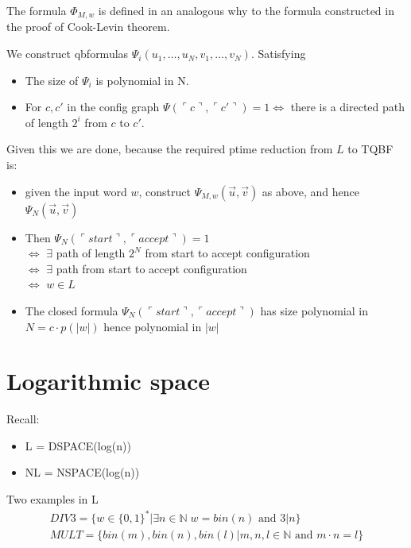 \documentclass[a4paper,12pt]{article}
\theoremstyle{definition}
\theoremstyle{remark}
\newcommand{\N}{\mathbb{N}}
\begin{document}
The formula $\Phi_{M, w}$ is defined in an analogous why to the formula constructed in the proof of Cook-Levin theorem.

We construct qbformulas $\Psi_i (u_1, \dots, u_N, v_1, \dots, v_N)$. Satisfying
\begin{itemize}
    \item The size of $\Psi_i$ is polynomial in N.
    \item For $c, c'$ in the config graph $\Psi(\ulcorner c \urcorner, \ulcorner c'\urcorner) = 1 \iff $ there is a directed path of length $2^i$ from $c$ to $c'$.
\end{itemize}

Given this we are done, because the required ptime reduction from $L$ to TQBF is:
\begin{itemize}
    \item given the input word $w$, construct $\Psi_{M, w} (\vec{u}, \vec{v})$ as above, and hence $\Psi_N(\vec{u}, \vec{v})$
    \item Then $\Psi_N (\ulcorner start \urcorner, \ulcorner accept \urcorner) = 1$ \\
    $\iff$ $\exists$ path of length $2^N$ from start to accept configuration \\
    $\iff$ $\exists$ path from start to accept configuration \\
    $\iff$ $w \in L$
    \item The closed formula $\Psi_N (\ulcorner start \urcorner, \ulcorner accept \urcorner)$ has size polynomial in $N = c \cdot p(|w|)$ hence polynomial in $|w|$
\end{itemize}







\newpage
\section{Logarithmic space}
Recall:
\begin{itemize}
    \item L = DSPACE(log(n))
    \item NL = NSPACE(log(n))
\end{itemize}

Two examples in L
\begin{gather*}
    DIV3 = \{w \in \{0, 1\}^* | \exists n \in \N \; w = bin(n) \text{ and } 3|n\} \\
    MULT = \{bin(m), bin(n), bin(l) | m, n, l \in \N \text{ and } m \cdot n = l\}
\end{gather*}
\end{document}
